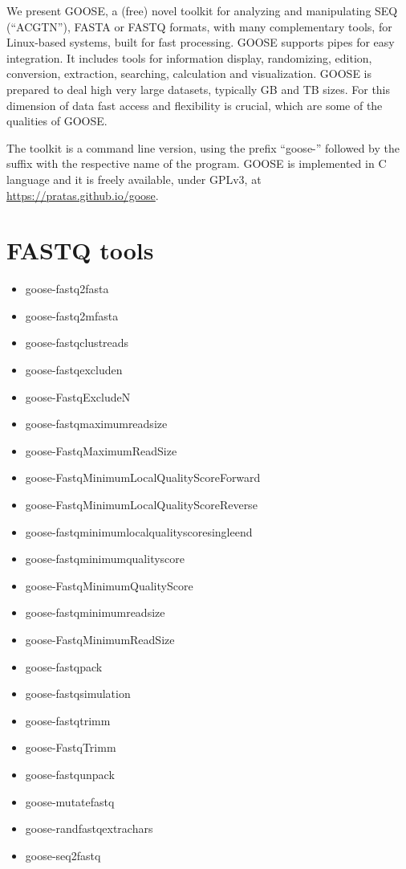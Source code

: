 \documentclass[11pt,journal,compsoc]{report}[1]
\begin{document}
We present GOOSE, a (free) novel toolkit for analyzing and manipulating
SEQ (``ACGTN''), FASTA or FASTQ formats, with many complementary tools,
for Linux-based systems, built for fast processing.
GOOSE supports pipes for easy integration. It includes tools for information 
display, randomizing, edition, conversion, extraction, searching,
calculation and visualization. GOOSE is prepared to deal high
very large datasets, typically GB and TB sizes. For this dimension of data
fast access and flexibility is crucial, which are some of the qualities of
GOOSE. 

The toolkit is a command line version, using the prefix ``goose-'' 
followed by the suffix with the respective name of the program.
GOOSE is implemented in C language and it is freely available, under GPLv3, 
at \url{https://pratas.github.io/goose}.


\chapter*{FASTQ tools}

\begin{itemize}
\item goose-fastq2fasta
\item goose-fastq2mfasta
\item goose-fastqclustreads
\item goose-fastqexcluden
\item goose-FastqExcludeN
\item goose-fastqmaximumreadsize
\item goose-FastqMaximumReadSize
\item goose-FastqMinimumLocalQualityScoreForward
\item goose-FastqMinimumLocalQualityScoreReverse
\item goose-fastqminimumlocalqualityscoresingleend
\item goose-fastqminimumqualityscore
\item goose-FastqMinimumQualityScore
\item goose-fastqminimumreadsize
\item goose-FastqMinimumReadSize
\item goose-fastqpack
\item goose-fastqsimulation
\item goose-fastqtrimm
\item goose-FastqTrimm
\item goose-fastqunpack
\item goose-mutatefastq
\item goose-randfastqextrachars
\item goose-seq2fastq
\end{itemize}
\end{document}
